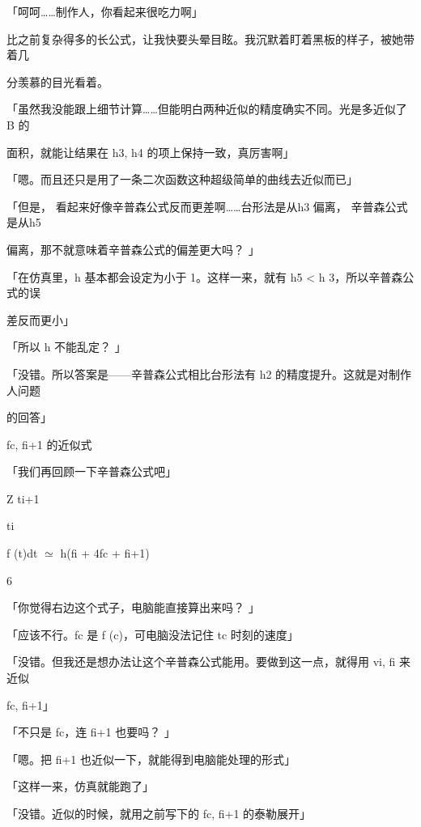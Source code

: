 「呵呵……制作人，你看起来很吃力啊」\par
比之前复杂得多的长公式，让我快要头晕目眩。我沉默着盯着黑板的样子，被她带着几\par
分羡慕的目光看着。\par
「虽然我没能跟上细节计算……但能明白两种近似的精度确实不同。光是多近似了 B 的\par
面积，就能让结果在 h3, h4 的项上保持一致，真厉害啊」\par
「嗯。而且还只是用了一条二次函数这种超级简单的曲线去近似而已」\par
「但是， 看起来好像辛普森公式反而更差啊……台形法是从h3 偏离， 辛普森公式是从h5\par
偏离，那不就意味着辛普森公式的偏差更大吗？ 」\par
「在仿真里，h 基本都会设定为小于 1。这样一来，就有 h5 < h 3，所以辛普森公式的误\par
差反而更小」\par
「所以 h 不能乱定？ 」\par
「没错。所以答案是——辛普森公式相比台形法有 h2 的精度提升。这就是对制作人问题\par
的回答」\par
fc, fi+1 的近似式\par
「我们再回顾一下辛普森公式吧」\par
Z ti+1\par
ti\par
f (t)dt $\simeq$ h(fi + 4fc + fi+1)\par
6\par
「你觉得右边这个式子，电脑能直接算出来吗？ 」\par
「应该不行。fc 是 f (c)，可电脑没法记住 tc 时刻的速度」\par
「没错。但我还是想办法让这个辛普森公式能用。要做到这一点，就得用 vi, fi 来近似\par
fc, fi+1」\par
「不只是 fc，连 fi+1 也要吗？ 」\par
「嗯。把 fi+1 也近似一下，就能得到电脑能处理的形式」\par
「这样一来，仿真就能跑了」\par
「没错。近似的时候，就用之前写下的 fc, fi+1 的泰勒展开」\par


